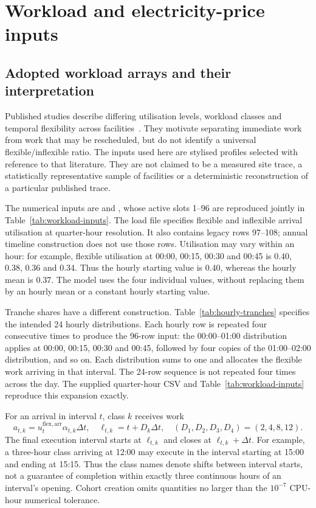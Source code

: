 \section{Workload and electricity-price inputs}
\subsection{Adopted workload arrays and their interpretation}
Published studies describe differing utilisation levels, workload classes and temporal flexibility across facilities~\cite{Cao2022ApEn,6779441,Misaghian2023TIA,Liu2012PER}. They motivate separating immediate work from work that may be rescheduled, but do not identify a universal flexible/inflexible ratio. The inputs used here are stylised profiles selected with reference to that literature. They are not claimed to be a measured site trace, a statistically representative sample of facilities or a deterministic reconstruction of a particular published trace.

The numerical inputs are  and , whose active slots 1--96 are reproduced jointly in Table~\ref{tab:workload-inputs}. The load file specifies flexible and inflexible arrival utilisation at quarter-hour resolution. It also contains legacy rows 97--108; annual timeline construction does not use those rows. Utilisation may vary within an hour: for example, flexible utilisation at 00:00, 00:15, 00:30 and 00:45 is 0.40, 0.38, 0.36 and 0.34. Thus the hourly starting value is 0.40, whereas the hourly mean is 0.37. The model uses the four individual values, without replacing them by an hourly mean or a constant hourly starting value.

Tranche shares have a different construction. Table~\ref{tab:hourly-tranches} specifies the intended 24 hourly distributions. Each hourly row is repeated four consecutive times to produce the 96-row input: the 00:00--01:00 distribution applies at 00:00, 00:15, 00:30 and 00:45, followed by four copies of the 01:00--02:00 distribution, and so on. Each distribution sums to one and allocates the flexible work arriving in that interval. The 24-row sequence is not repeated four times across the day. The supplied quarter-hour CSV and Table~\ref{tab:workload-inputs} reproduce this expansion exactly.



For an arrival in interval $t$, class $k$ receives work
\begin{equation}
a_{t,k}=u_t^{\mathrm{flex,arr}}\alpha_{t,k}\Delta t,
\quad \ell_{t,k}=t+D_k\Delta t,
\quad (D_1,D_2,D_3,D_4)=(2,4,8,12).
\end{equation}
The final execution interval starts at $\ell_{t,k}$ and closes at $\ell_{t,k}+\Delta t$. For example, a three-hour class arriving at 12:00 may execute in the interval starting at 15:00 and ending at 15:15. Thus the class names denote shifts between interval starts, not a guarantee of completion within exactly three continuous hours of an interval's opening. Cohort creation omits quantities no larger than the $10^{-7}$ CPU-hour numerical tolerance.

